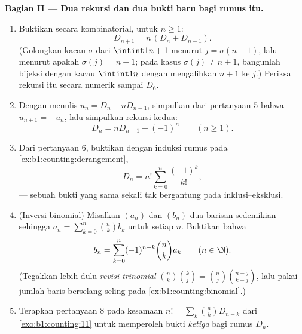 \begin{problem}
\medskip
\noindent\textbf{Bagian II --- Dua rekursi dan dua bukti baru bagi
rumus itu.}
\begin{enumerate}[resume]
  \item Buktikan secara kombinatorial, untuk $n \geq 1$:
        \[
        D_{n+1} = n\,(D_n + D_{n-1}) .
        \]
        (Golongkan  kacau $\sigma$ dari $\intint1{n+1}$ menurut
        $j = \sigma(n+1)$, lalu menurut apakah $\sigma(j) = n + 1$; pada
        kasus $\sigma(j) \neq n+1$, bangunlah bijeksi dengan
         kacau $\intint1n$ dengan mengalihkan 
        $n + 1$ ke $j$.) Periksa rekursi itu secara numerik sampai
        $D_6$.
  \item Dengan menulis $u_n = D_n - n D_{n-1}$, simpulkan dari pertanyaan 5
        bahwa $u_{n+1} = -u_n$, lalu simpulkan rekursi kedua:
        \[
        D_n = n D_{n-1} + (-1)^n \qquad (n \geq 1).
        \]
  \item Dari pertanyaan 6, buktikan dengan induksi rumus pada
        \cref{ex:b1:counting:derangement},
        \[
        D_n = n! \sum_{k=0}^{n} \frac{(-1)^k}{k!},
        \]
        --- sebuah bukti yang sama sekali tak bergantung pada inklusi--eksklusi.
  \item (Inversi binomial) Misalkan $(a_n)$ dan $(b_n)$ dua
        barisan sedemikian sehingga $a_n = \sum_{k=0}^n \binom nk b_k$ untuk
        setiap $n$. Buktikan bahwa
        \[
        b_n = \sum_{k=0}^{n} (-1)^{n-k} \binom nk a_k
        \qquad (n \in \N).
        \]
        (Tegakkan lebih dulu \emph{revisi trinomial}
        $\binom nk \binom kj = \binom nj \binom{n-j}{k-j}$, lalu
        pakai jumlah baris berselang-seling pada
        \cref{ex:b1:counting:binomial}.)
  \item Terapkan pertanyaan 8 pada kesamaan $n! = \sum_k \binom nk
        D_{n-k}$ dari \cref{exo:b1:counting:11} untuk memperoleh bukti
        \emph{ketiga} bagi rumus $D_n$.
\end{enumerate}


\end{problem}
